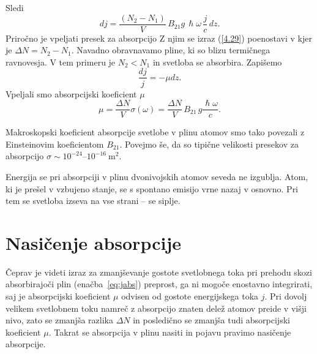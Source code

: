 Sledi
\begin{equation}
dj=\frac{(N_{2}-N_{1})}{V}\, B_{21}g\, \hslash\omega\,\frac{j}{c}\, dz.
\label{4.29}
\end{equation}
Priročno je vpeljati presek za absorpcijo 
Z njim se izraz (\ref{4.29}) poenostavi v 
kjer je $\Delta N = N_{2}-N_{1}$.
Navadno obravnavamo pline, ki so blizu termičnega ravnovesja. V tem primeru 
je $N_{2}<N_{1}$ in svetloba se absorbira.
Zapišemo 
\begin{equation}
\frac{dj}{j} = -\mu dz.
\label{eq:jabs}
\end{equation}
Vpeljali smo absorpcijski koeficient $\mu$ 
\begin{equation}
\mu=\frac{\Delta N}{V}\sigma(\omega)=
\frac{\Delta N}{V}\, B_{21}\, g\frac{\hslash\omega}{c}.
\label{eq:muabs1}
\end{equation}
 
Makroskopski koeficient absorpcije svetlobe v plinu atomov smo tako povezali
z Einsteinovim koefici\-entom $B_{21}$. Povejmo še, da so 
tipične velikosti presekov za absorpcijo $\sigma \sim 10^{-24}$--$10^{-16}~\si{\metre^2}$.

\begin{remark}
Energija se pri absorpciji v plinu dvonivojskih atomov seveda
ne izgublja. Atom, ki je prešel v vzbujeno stanje, se s spontano 
emisijo vrne nazaj v osnovno. Pri tem se svetloba izseva na vse strani -- se siplje. 
\end{remark}

\section{Nasičenje absorpcije}
\label{chap:NasAbs}
Čeprav je videti izraz za zmanjševanje 
gostote svetlobnega toka pri prehodu skozi absorbirajoči plin (enačba~\ref{eq:jabs}) 
preprost, ga ni mogoče enostavno integrirati, saj je absorpcijski koeficient 
$\mu$ odvisen od 
gostote energijskega toka $j$. Pri dovolj velikem svetlobnem toku namreč z 
absorpcijo znaten delež atomov preide v višji nivo, zato se zmanjša razlika $\Delta N$
in posledično se zmanjša tudi absorpcijski koeficient $\mu$. Takrat se absorpcija
v plinu nasiti in pojavu pravimo nasičenje absorpcije.

